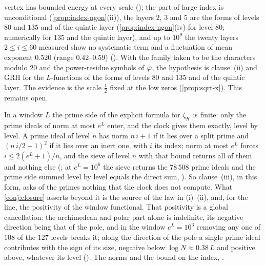 \begin{remark}
vertex has bounded energy at every scale
();
the part of large index is unconditional
(\cref{prop:index-ngon}(ii)), the layers $2$, $3$ and $5$
are the forms of levels $80$ and $135$ and of the quintic
layer (\cref{prop:index-ngon}(iv) for level $80$;
numerically for $135$ and the quintic layer), and up to $10^9$ the
twenty layers $2\leq i\leq60$ measured show no systematic
term and a fluctuation of mean exponent $0.520$
(range $0.42$--$0.59$) ().  With the family taken to
be the characters modulo $20$ and the power-residue
symbols of $\varphi$, the hypothesis is clause~(ii) and
GRH for the $L$-functions of the forms of levels $80$ and
$135$ and of the quintic layer.  The evidence is the scale $\tfrac12$ fixed at the low
zeros (\cref{prop:sqrt-x}).  This remains open.
\end{remark}

\begin{remark}\label{rmk:closure-window}
In a window $L$ the prime side of the explicit formula for $\zeta_K$ is finite: only the prime
ideals of norm at most $e^L$ enter, and the clock gives them exactly, level by level.  A prime
ideal of level $n$ has norm $n\,i+1$ if it lies over a split prime and $(n\,i/2-1)^2$ if it lies
over an inert one, with $i$ its index; norm at most $e^L$ forces $i\le 2(e^L+1)/n$, and the sieve of
level $n$ with that bound returns all of them and nothing else
(; at $e^L=10^6$ the sieve returns the $78\,508$ prime
ideals and the prime side summed level by level equals the direct sum, ).
So clause~(iii), in this form, asks of the primes nothing that the clock does not compute.
What \cref{conj:closure} asserts beyond it is the source of the law in (i)--(ii), and, for the
line, the positivity of the window functional.  That positivity is a global cancellation: the
archimedean and polar part alone is indefinite, its negative direction being that of the pole,
and in the window $e^L=10^3$ removing any one of $108$ of the $127$ levels breaks it; along the
direction of the pole a single prime ideal contributes with the sign of its size, negative below
$\log N\approx0.38\,L$ and positive above, whatever its level ().
The norms and the bound on the index, .
\end{remark}


